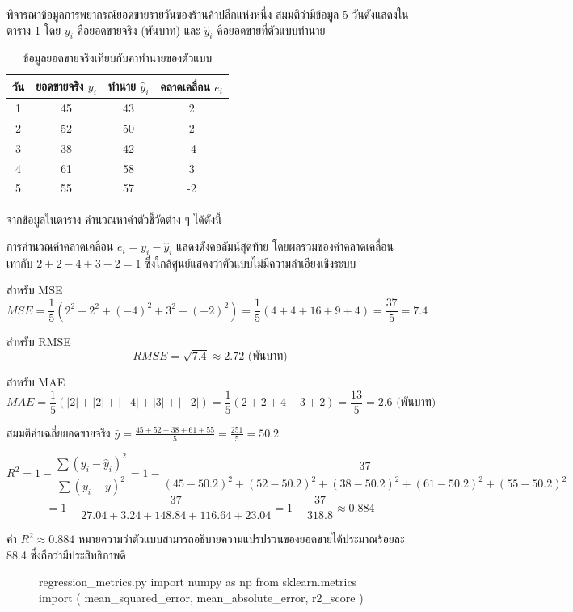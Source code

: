 \begin{exmp}
พิจารณาข้อมูลการพยากรณ์ยอดขายรายวันของร้านค้าปลีกแห่งหนึ่ง สมมติว่ามีข้อมูล 5 วันดังแสดงในตาราง \ref{table:sales_error} โดย $y_i$ คือยอดขายจริง (พันบาท) และ $\hat{y}_i$ คือยอดขายที่ตัวแบบทำนาย

\begin{table}[h]
\centering
\caption{ข้อมูลยอดขายจริงเทียบกับค่าทำนายของตัวแบบ}
\label{table:sales_error}
\begin{tabular}{|c|c|c|c|}
\hline
\textbf{วัน} & \textbf{ยอดขายจริง $y_i$} & \textbf{ทำนาย $\hat{y}_i$} & \textbf{คลาดเคลื่อน $e_i$} \\ \hline
1 & 45 & 43 & 2 \\ \hline
2 & 52 & 50 & 2 \\ \hline
3 & 38 & 42 & -4 \\ \hline
4 & 61 & 58 & 3 \\ \hline
5 & 55 & 57 & -2 \\ \hline
\end{tabular}
\end{table}

จากข้อมูลในตาราง คำนวณหาค่าตัวชี้วัดต่าง ๆ ได้ดังนี้

การคำนวณค่าคลาดเคลื่อน $e_i = y_i - \hat{y}_i$ แสดงดังคอลัมน์สุดท้าย โดยผลรวมของค่าคลาดเคลื่อนเท่ากับ $2+2-4+3-2 = 1$ ซึ่งใกล้ศูนย์แสดงว่าตัวแบบไม่มีความลำเอียงเชิงระบบ

สำหรับ MSE
$$MSE = \frac{1}{5}(2^2 + 2^2 + (-4)^2 + 3^2 + (-2)^2) = \frac{1}{5}(4+4+16+9+4) = \frac{37}{5} = 7.4$$

สำหรับ RMSE
$$RMSE = \sqrt{7.4} \approx 2.72 \text{ (พันบาท)}$$

สำหรับ MAE
$$MAE = \frac{1}{5}(|2| + |2| + |-4| + |3| + |-2|) = \frac{1}{5}(2+2+4+3+2) = \frac{13}{5} = 2.6 \text{ (พันบาท)}$$

สมมติค่าเฉลี่ยยอดขายจริง $\bar{y} = \frac{45+52+38+61+55}{5} = \frac{251}{5} = 50.2$

$$R^2 = 1 - \frac{\sum(y_i - \hat{y}_i)^2}{\sum(y_i - \bar{y})^2} = 1 - \frac{37}{(45-50.2)^2+(52-50.2)^2+(38-50.2)^2+(61-50.2)^2+(55-50.2)^2}$$
$$= 1 - \frac{37}{27.04+3.24+148.84+116.64+23.04} = 1 - \frac{37}{318.8} \approx 0.884$$

ค่า $R^2 \approx 0.884$ หมายความว่าตัวแบบสามารถอธิบายความแปรปรวนของยอดขายได้ประมาณร้อยละ 88.4 ซึ่งถือว่ามีประสิทธิภาพดี

\begin{figure}[h]
\begin{pycode}{regression\_metrics.py}
import numpy as np
from sklearn.metrics import (
    mean_squared_error,
    mean_absolute_error,
    r2_score
)


\end{pycode}
\end{figure}
\end{exmp}

